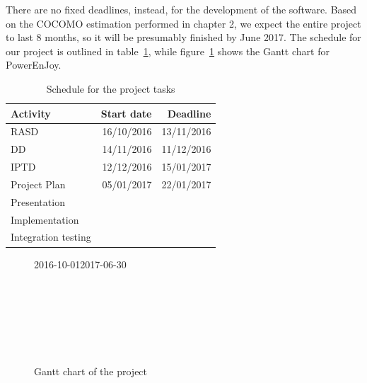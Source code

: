 There are no fixed deadlines, instead, for the development of the software. Based on the COCOMO estimation performed in chapter 2, we expect the entire project to last 8 months, so it will be presumably finished by June 2017. The schedule for our project is outlined in table~\ref{tab:schedule}, while figure~\ref{fig:gantt} shows the Gantt chart for PowerEnJoy.

\begin{table}[H]
	\centering
	\begin{tabular}{|l|r|r|}
		\hline
		\textbf{Activity} & \textbf{Start date} & \textbf{Deadline} \\
		\hline
		RASD & 16/10/2016 & 13/11/2016 \\
		DD & 14/11/2016 & 11/12/2016 \\
		IPTD & 12/12/2016 & 15/01/2017 \\
		Project Plan & 05/01/2017 & 22/01/2017 \\
		Presentation &  &  \\
		Implementation &   &  \\
		Integration testing &   &  \\
		\hline	
	\end{tabular}

	\caption{Schedule for the project tasks}
	\label{tab:schedule}
\end{table}

\begin{figure}[H]
	\centering
	\begin{sideways}	
		\begin{ganttchart}[
			vgrid={*{6}{draw=none},dotted},
			time slot format=isodate,
			x unit=0.7mm,
			today=2017-01-22,
			today rule/.style= {ultra thick},
			today label=Today,
			link bulge=6, link tolerance=5,
			bar inline label node/.style={font=\scriptsize},
			inline
			]{2016-10-01}{2017-06-30}
			 \\
			 \\
			 \\
			 \\
			 \\
			 \\
			 \\
		\end{ganttchart}
	\end{sideways}

	\caption{Gantt chart of the project}
	\label{fig:gantt}
\end{figure}